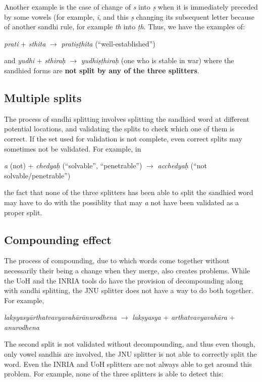 \documentclass[11pt]{article}
\begin{document}
 Another example is the case of change of \textit{s} into \textit{\d{s}} when it is immediately preceded by some vowels (for example, \textit{i}, and this \textit{\d{s}} changing its subsequent letter because of another sandhi rule, for example  \textit{th} into \textit{\d{t}h}. Thus, we have the examples of:
 
                    \textit{prati} + \textit{sthita} $\rightarrow$ \textit{prati\d{s}\d{t}hita} (``well-established'')
                     
                     
and   \textit{yudhi} + \textit{sthira\d{h}} $\rightarrow$ \textit{yudhi\d{s}\d{t}hira\d{h}}  (one who is stable in war)
where the sandhied forms are \textbf{not split by any of the three splitters}.


\subsection{Multiple splits} 
The process of sandhi splitting involves splitting the sandhied word at different potential locations, and validating the splits to check which one of them is correct. If the set used for validation is not complete, even correct splits may sometimes not be validated. For example, in 

   \textit{a} (not) + \textit{chedya\d{h}} (``solvable'', ``penetrable'') $\rightarrow$ \textit{acchedya\d{h}} (``not solvable/penetrable'')
   
the fact that none of the three splitters has been able to split the sandhied word may have to do with the possiblity that may \textit{a} not have been validated as a proper split.


\subsection{Compounding effect}
The process of compounding, due to which words come together without necessarily their being a change when they merge, also creates problems. While the UoH and the INRIA tools do have the provision of decompounding along with sandhi splitting, the JNU splitter does not have a way to do both together.
For example,

\textit{lak\d{s}yasy\={a}rthatvavyavah\={a}r\={a}nurodhena} $\rightarrow$  \textit{lak\d{s}yasya} + \textit{arthatvavyavah\={a}ra} + \textit{anurodhena} 

The second split is not validated without decompounding, and thus even though, only vowel sandhis are involved, the JNU splitter is not able to correctly split the word.  
Even the INRIA and UoH splitters are not always able to get around this problem.
For example, none of the three splitters is able to detect this:
\end{document}
